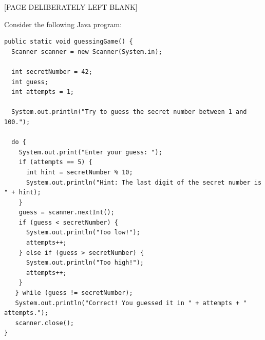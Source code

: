\documentclass[addpoints]{exam}
\begin{document}
\begin{questions}

\newpage
\begin{center}
  [PAGE DELIBERATELY LEFT BLANK]
\end{center}
\newpage

\question Consider the following Java program:
  \begin{verbatim}
public static void guessingGame() {
  Scanner scanner = new Scanner(System.in);

  int secretNumber = 42;
  int guess;
  int attempts = 1;

  System.out.println("Try to guess the secret number between 1 and 100.");

  do {
    System.out.print("Enter your guess: ");
    if (attempts == 5) {
      int hint = secretNumber % 10;
      System.out.println("Hint: The last digit of the secret number is " + hint);
    }
    guess = scanner.nextInt();
    if (guess < secretNumber) {
      System.out.println("Too low!");
      attempts++;
    } else if (guess > secretNumber) {
      System.out.println("Too high!");
      attempts++;
    }
   } while (guess != secretNumber);
   System.out.println("Correct! You guessed it in " + attempts + " attempts.");
   scanner.close();
}
\end{verbatim}


\end{questions}
\end{document}
